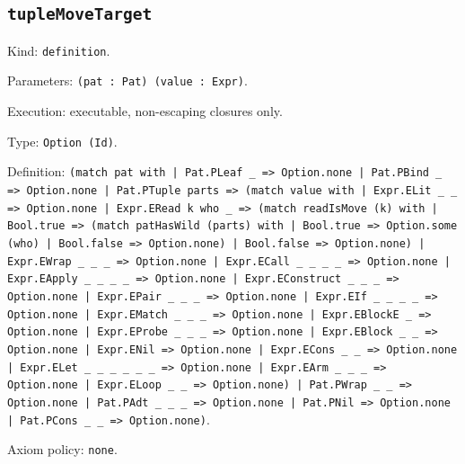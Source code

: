 \documentclass[11pt]{article}
\begin{document}
\subsection*{\texttt{tupleMoveTarget}}
\noindent Kind: \texttt{definition}.\par
\noindent Parameters: \texttt{(pat : Pat) (value : Expr)}.\par
\noindent Execution: executable, non-escaping closures only.\par
\noindent Type: \texttt{Option (Id)}.\par
\noindent Definition: \texttt{(match pat with | Pat.PLeaf \_ => Option.none | Pat.PBind \_ => Option.none | Pat.PTuple parts => (match value with | Expr.ELit \_ \_ => Option.none | Expr.ERead k who \_ => (match readIsMove (k) with | Bool.true => (match patHasWild (parts) with | Bool.true => Option.some (who) | Bool.false => Option.none) | Bool.false => Option.none) | Expr.EWrap \_ \_ \_ => Option.none | Expr.ECall \_ \_ \_ \_ => Option.none | Expr.EApply \_ \_ \_ \_ => Option.none | Expr.EConstruct \_ \_ \_ => Option.none | Expr.EPair \_ \_ \_ => Option.none | Expr.EIf \_ \_ \_ \_ => Option.none | Expr.EMatch \_ \_ \_ => Option.none | Expr.EBlockE \_ => Option.none | Expr.EProbe \_ \_ \_ => Option.none | Expr.EBlock \_ \_ => Option.none | Expr.ENil => Option.none | Expr.ECons \_ \_ => Option.none | Expr.ELet \_ \_ \_ \_ \_ \_ => Option.none | Expr.EArm \_ \_ \_ => Option.none | Expr.ELoop \_ \_ => Option.none) | Pat.PWrap \_ \_ => Option.none | Pat.PAdt \_ \_ \_ => Option.none | Pat.PNil => Option.none | Pat.PCons \_ \_ => Option.none)}.\par
\noindent Axiom policy: \texttt{none}.\par
\end{document}
